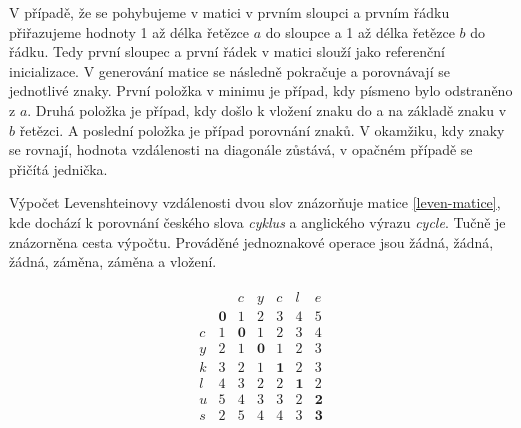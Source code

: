 \documentclass[a4paper,11pt,titlepage,fleqn]{article}
\begin{document}
            V případě, že se pohybujeme v matici v prvním sloupci a prvním řádku přiřazujeme hodnoty 1 až délka řetězce $a$ do sloupce a 1 až délka řetězce $b$ do řádku. Tedy první sloupec a první řádek v matici slouží jako referenční inicializace. V generování matice se následně pokračuje a porovnávají se jednotlivé znaky. První položka v minimu je případ, kdy písmeno bylo odstraněno z $a$. Druhá položka je případ, kdy došlo k vložení znaku do a na základě znaku v $b$ řetězci. A poslední položka je případ porovnání znaků. V okamžiku, kdy znaky se rovnají, hodnota vzdálenosti na diagonále zůstává, v opačném případě se přičítá jednička.

            Výpočet Levenshteinovy vzdálenosti dvou slov znázorňuje matice \ref{leven-matice}, kde dochází k porovnání českého slova \textit{cyklus} a anglického výrazu \textit{cycle}. Tučně je znázorněna cesta výpočtu. Prováděné jednoznakové operace jsou žádná, žádná, žádná, záměna, záměna a vložení.

            \begin{ceqn}
            \begin{align}
                \label{leven-matice}
                \begin{matrix}
                    &  & c & y & c & l & e \\
                    & \textbf{0} & 1 & 2  & 3 & 4  & 5 \\
                    c & 1 & \textbf{0} & 1 & 2 & 3 & 4 \\
                    y & 2 & 1 & \textbf{0} & 1 & 2 & 3 \\
                    k & 3 & 2 & 1 & \textbf{1} & 2 & 3 \\
                    l & 4 & 3 & 2 & 2 & \textbf{1} & 2 \\
                    u & 5 & 4 & 3 & 3 & 2 & \textbf{2} \\
                    s & 2 & 5 & 4 & 4 & 3 & \textbf{3} \\ 
                \end{matrix}
            \end{align}
            \end{ceqn}
\end{document}
